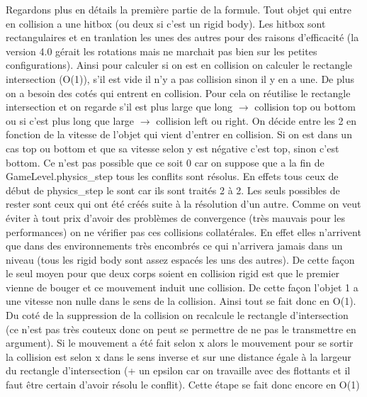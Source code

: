 \documentclass[11pt]{article}
\begin{document}
\indent Regardons plus en détails la première partie de la formule. Tout objet qui entre en collision a une hitbox (ou deux si c'est un rigid body). Les hitbox sont rectangulaires et en tranlation les unes des autres pour des raisons d'efficacité (la version 4.0 gérait les rotations mais ne marchait pas bien sur les petites configurations). Ainsi pour calculer si on est en collision on calculer le rectangle intersection (O(1)), s'il est vide il n'y a pas collision sinon il y en a une. De plus on a besoin des cotés qui entrent en collision. Pour cela on réutilise le rectangle intersection et on regarde s'il est plus large que long $\rightarrow$ collision top ou bottom ou si c'est plus long que large $\rightarrow$ collision left ou right. On décide entre les 2 en fonction de la vitesse de l'objet qui vient d'entrer en collision. Si on est dans un cas top ou bottom et que sa vitesse selon y est négative c'est top, sinon c'est bottom. Ce n'est pas possible que ce soit 0 car on suppose que a la fin de GameLevel.physics\_step tous les conflits sont résolus. En effets tous ceux de début de physics\_step le sont car ils sont traités 2 à 2. Les seuls possibles de rester sont ceux qui ont été créés suite à la résolution d'un autre. Comme on veut éviter à tout prix d'avoir des problèmes de convergence (très mauvais pour les performances) on ne vérifier pas ces collisions collatérales. En effet elles n'arrivent que dans des environnements très encombrés ce qui n'arrivera jamais dans un niveau (tous les rigid body sont assez espacés les uns des autres). De cette façon le seul moyen pour que deux corps soient en collision rigid est que le premier vienne de bouger et ce mouvement induit une collision. De cette façon l'objet 1 a une vitesse non nulle dans le sens de la collision. Ainsi tout se fait donc en O(1).
\indent Du coté de la suppression de la collision on recalcule le rectangle d'intersection (ce n'est pas très couteux donc on peut se permettre de ne pas le transmettre en argument). Si le mouvement a été fait selon x alors le mouvement pour se sortir la collision est selon x dans le sens inverse et sur une distance égale à la largeur du rectangle d'intersection (+ un epsilon car on travaille avec des flottants et il faut être certain d'avoir résolu le conflit). Cette étape se fait donc encore en O(1)\\
\end{document}
